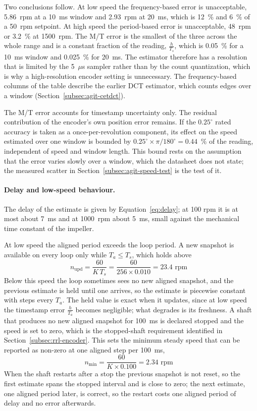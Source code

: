 Two conclusions follow. At low speed the frequency-based error is unacceptable, 5.86~rpm at a 10~ms window and 2.93~rpm at 20~ms, which is 12~\% and 6~\% of a 50~rpm setpoint. At high speed the period-based error is unacceptable, 48~rpm or 3.2~\% at 1500~rpm. The M/T error is the smallest of the three across the whole range and is a constant fraction of the reading, $\frac{h}{T_s}$, which is 0.05~\% for a 10~ms window and 0.025~\% for 20~ms. The estimator therefore has a resolution that is limited by the 5~$\mu$s sampler rather than by the count quantization, which is why a high-resolution encoder setting is unnecessary. The frequency-based columns of the table describe the earlier DCT estimator, which counts edges over a window (Section~\ref{subsec:agit-cetdct}).

The M/T error accounts for timestamp uncertainty only. The residual contribution of the encoder's own position error remains. If the $0.25^{\circ}$ rated accuracy is taken as a once-per-revolution component, its effect on the speed estimated over one window is bounded by $0.25^{\circ} \times \pi / 180^{\circ} = 0.44$~\% of the reading, independent of speed and window length. This bound rests on the assumption that the error varies slowly over a window, which the datasheet does not state; the measured scatter in Section~\ref{subsec:agit-speed-test} is the test of it.

\paragraph{Delay and low-speed behaviour.}
The delay of the estimate is given by Equation~\ref{eq:delay}; at 100 rpm it is at most about 7~ms and at 1000~rpm about 5~ms, small against the mechanical time constant of the impeller.

At low speed the aligned period exceeds the loop period. A new snapshot is available on every loop only while $T_a \leq T_s$, which holds above
\begin{equation}
    n_{\text{upd}} = \frac{60}{K \, T_s} = \frac{60}{256 \times 0.010} = 23.4 \text{ rpm}
    \label{eq:nupd}
\end{equation}
Below this speed the loop sometimes sees no new aligned snapshot, and the previous estimate is held until one arrives, so the estimate is piecewise constant with steps every $T_a$. The held value is exact when it updates, since at low speed the timestamp error $\frac{h}{T_a}$ becomes negligible; what degrades is its freshness. A shaft that produces no new aligned snapshot for 100~ms is declared stopped and the speed is set to zero, which is the stopped-shaft requirement identified in Section~\ref{subsec:rrl-encoder}. This sets the minimum steady speed that can be reported as non-zero at one aligned step per 100~ms,
\begin{equation}
    n_{\min} = \frac{60}{K \times 0.100} = 2.34 \text{ rpm}
    \label{eq:nmin}
\end{equation}
When the shaft restarts after a stop the previous snapshot is not reset, so the first estimate spans the stopped interval and is close to zero; the next estimate, one aligned period later, is correct, so the restart costs one aligned period of delay and no error afterwards.

